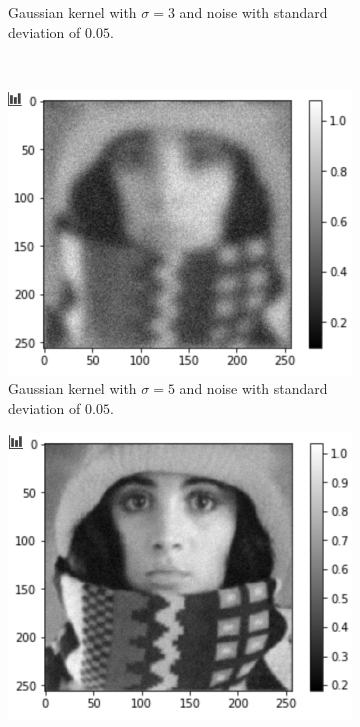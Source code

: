 \begin{figure}[H]
\begin{subfigure}[b]{0.45\linewidth}
		\caption{Gaussian kernel with $\sigma = 3$ and noise with standard deviation of $0.05$.}
	\end{subfigure}
	\\
	\begin{subfigure}[b]{0.45\linewidth}
		\centering
		\includegraphics[width=\linewidth]{Materials/E5/gaus5std005}
		\caption{Gaussian kernel with $\sigma = 5$ and noise with standard deviation of $0.05$.}
	\end{subfigure}
	\hfill
	\begin{subfigure}[b]{0.45\linewidth}
		\centering
		\includegraphics[width=\linewidth]{Materials/E5/gaus1std002}

\end{subfigure}
\end{figure}
